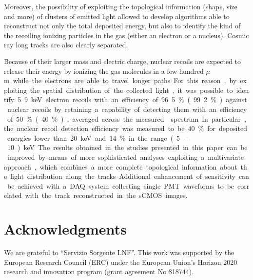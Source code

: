 \documentclass[12pt]{iopart}
\begin{document}
Moreover, the possibility of exploiting the topological information
(shape, size and more) of clusters of emitted light allowed to develop
algorithms able to reconstruct not only the total deposited energy,
but also to identify the kind of the recoiling ionizing particles in
the gas (either an electron or a nucleus). Cosmic ray long tracks are
also clearly separated.

Because of their larger mass and electric charge, nuclear recoils are
expected to release their energy by ionizing the gas molecules in a few
hundred \unit{$\mu$m} while the electrons are able to travel longer
paths. For this reason, by exploiting the spatial distribution of the
collected light, it was possible to identify 5.9\keV electron recoils
with an efficiency of 96.5\% (99.2\%) against nuclear recoils by
retaining a capability of detecting them with an efficiency of 50\%
(40\%), averaged across the measured \ambe spectrum.

In particular, the nuclear recoil detection efficiency was measured to
be 40\% for deposited energies lower than 20\keV and 14\% in the range
(5--10)\keV.

The results obtained in the studies presented in this paper can be
improved by means of more sophisticated analyses exploiting a
multivariate approach, which combines a more complete topological
information about the light distribution along the tracks.  Additional
enhancement of sensitivity can be achieved with a DAQ system
collecting single PMT waveforms to be correlated with the track
reconstructed in the sCMOS images.

\section{Acknowledgments}
We are grateful to ``Servizio Sorgente LNF''.  This work was supported
by the European Research Council (ERC) under the European Union’s
Horizon 2020 research and innovation program (grant agreement No
818744).



\end{document}
